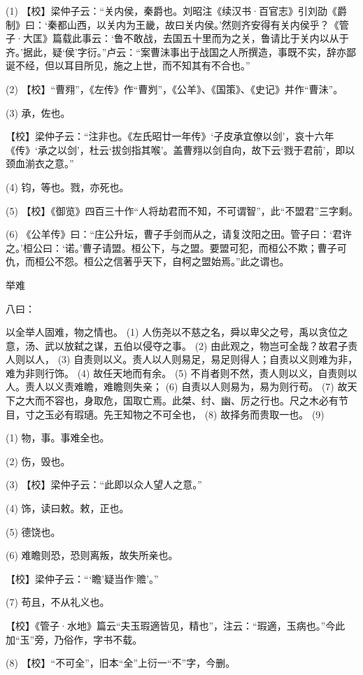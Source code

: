 \documentclass[12pt,UTF8]{ctexbook}
\begin{document}
(1) 【校】梁仲子云：“关内侯，秦爵也。刘昭注《续汉书·百官志》引刘劭《爵制》曰：‘秦都山西，以关内为王畿，故曰关内侯。’然则齐安得有关内侯乎？《管子·大匡》篇载此事云：‘鲁不敢战，去国五十里而为之关，鲁请比于关内以从于齐。’据此，疑‘侯’字衍。”卢云：“案曹沬事出于战国之人所撰造，事既不实，辞亦鄙诞不经，但以耳目所见，施之上世，而不知其有不合也。”

(2) 【校】“曹翙”，《左传》作“曹刿”，《公羊》、《国策》、《史记》并作“曹沬”。

(3) 承，佐也。

【校】梁仲子云：“注非也。《左氏昭廿一年传》‘子皮承宜僚以剑’，哀十六年《传》‘承之以剑’，杜云‘拔剑指其喉’。盖曹翙以剑自向，故下云‘戮于君前’，即以颈血湔衣之意。”

(4) 钧，等也。戮，亦死也。

(5) 【校】《御览》四百三十作“人将劫君而不知，不可谓智”，此“不盟君”三字剩。

(6) 《公羊传》曰：“庄公升坛，曹子手剑而从之，请复汶阳之田。管子曰：‘君许之。’桓公曰：‘诺。’曹子请盟。桓公下，与之盟。要盟可犯，而桓公不欺；曹子可仇，而桓公不怨。桓公之信著乎天下，自柯之盟始焉。”此之谓也。





举难


八曰：

以全举人固难，物之情也。 (1) 人伤尧以不慈之名，舜以卑父之号，禹以贪位之意，汤、武以放弑之谋，五伯以侵夺之事。 (2) 由此观之，物岂可全哉？故君子责人则以人， (3) 自责则以义。责人以人则易足，易足则得人；自责以义则难为非，难为非则行饰。 (4) 故任天地而有余。 (5) 不肖者则不然，责人则以义，自责则以人。责人以义责难瞻，难瞻则失亲； (6) 自责以人则易为，易为则行苟。 (7) 故天下之大而不容也，身取危，国取亡焉。此桀、纣、幽、厉之行也。尺之木必有节目，寸之玉必有瑕瓋。先王知物之不可全也， (8) 故择务而贵取一也。 (9)

(1) 物，事。事难全也。

(2) 伤，毁也。

(3) 【校】梁仲子云：“此即以众人望人之意。”

(4) 饰，读曰敕。敕，正也。

(5) 德饶也。

(6) 难瞻则恐，恐则离叛，故失所亲也。

【校】梁仲子云：“‘瞻’疑当作‘赡’。”

(7) 苟且，不从礼义也。

【校】《管子·水地》篇云“夫玉瑕適皆见，精也”，注云：“瑕適，玉病也。”今此加“玉”旁，乃俗作，字书不载。

(8) 【校】“不可全”，旧本“全”上衍一“不”字，今删。
\end{document}
